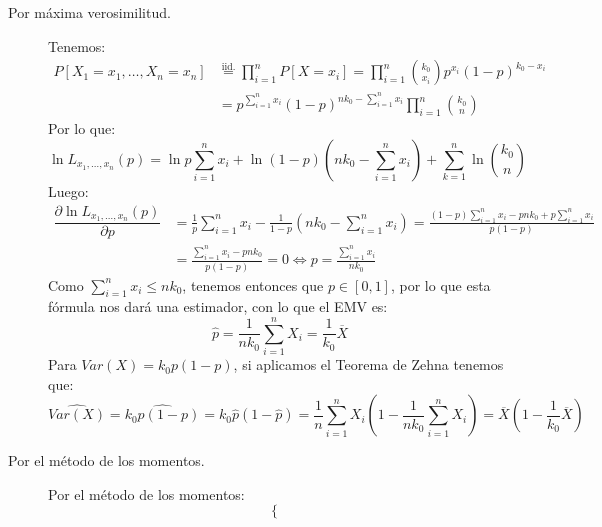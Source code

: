 \begin{ejercicio}
    \begin{description}
        \item [Por máxima verosimilitud.] 
            Tenemos:
            \begin{align*}
                P[X_1 =x_1, \ldots, X_n = x_n] &\stackrel{\text{iid.}}{=}\prod_{i=1}^{n} P[X=x_i] = \prod_{i=1}^{n} \binom{k_0}{x_i} p^{x_i}{(1-p)}^{k_0-x_i} \\ &= p^{\sum\limits_{i=1}^{n}x_i}{(1-p)}^{nk_0-\sum\limits_{i=1}^{n}x_i} \prod_{i=1}^{n}\binom{k_0}{n}
            \end{align*}
            Por lo que:
            \begin{equation*}
                \ln L_{x_1,\ldots,x_n}(p) = \ln p \sum_{i=1}^{n}x_i + \ln(1-p)\left(nk_0 - \sum_{i=1}^{n}x_i\right) + \sum_{k=1}^{n}\ln\binom{k_0}{n}
            \end{equation*}
            Luego:
            \begin{align*}
                \dfrac{\partial \ln L_{x_1,\ldots,x_n}(p)}{\partial p} &= \frac{1}{p}\sum_{i=1}^{n}x_i - \frac{1}{1-p}\left(nk_0 - \sum_{i=1}^{n}x_i\right) = \frac{(1-p)\sum\limits_{i=1}^{n}x_i - pnk_0 + p\sum\limits_{i=1}^{n}x_i}{p(1-p)} \\
                                                                       &= \frac{\sum\limits_{i=1}^{n}x_i -pnk_0}{p(1-p)} = 0 \Longleftrightarrow p = \frac{\sum\limits_{i=1}^{n}x_i}{nk_0}
            \end{align*}
            Como $\sum\limits_{i=1}^{n}x_i\leq nk_0$, tenemos entonces que $p\in [0,1]$, por lo que esta fórmula nos dará una estimador, con lo que el EMV es:
            \begin{equation*}
                \hat{p} = \frac{1}{nk_0}\sum_{i=1}^{n}X_i = \frac{1}{k_0}\overline{X}
            \end{equation*}
            Para $Var(X) = k_0p(1-p)$, si aplicamos el Teorema de Zehna tenemos que:
            \begin{equation*}
                \widehat{Var(X)} = \widehat{k_0p(1-p)} = k_0\hat{p}(1-\hat{p}) = \frac{1}{n}\sum_{i=1}^{n}X_i\left(1-\frac{1}{nk_0}\sum_{i=1}^{n}X_i\right) = \overline{X}\left(1-\frac{1}{k_0}\overline{X}\right)
            \end{equation*}
        \item [Por el método de los momentos.] 
            Por el método de los momentos:
            \begin{equation*}
                \left\{\begin{array}{l}

\end{array}
\end{equation*}
\end{description}
\end{ejercicio}

